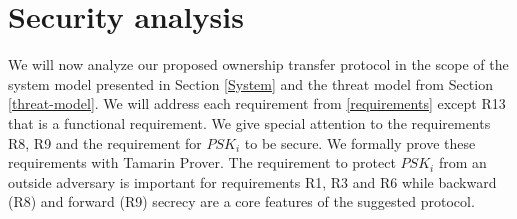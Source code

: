 {\section{Security analysis}
\label{analysis}
We will now analyze our proposed ownership transfer protocol in the scope of the system model presented in Section \ref{System} and the threat model from Section \ref{threat-model}. We will address each requirement from \ref{requirements} except R13 that is a functional requirement. We give special attention to the requirements R8, R9 and the requirement for $PSK_i$ to be secure. We formally prove these requirements with Tamarin Prover\cite{basin2017symbolically}. The requirement to protect $PSK_i$ from an outside adversary is important for requirements R1, R3 and R6 while backward (R8) and forward (R9) secrecy are a core features of the suggested protocol.



}
